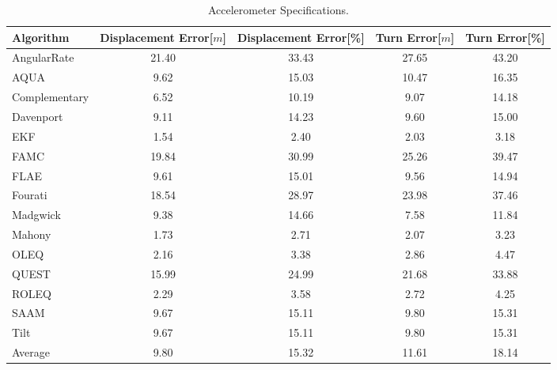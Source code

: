 \begin{table}[H]
    \begin{center}
        \begin{tabular}[t]{lcccc}
            \hline
            Algorithm                   & Displacement Error[$m$] & Displacement Error[\%]      & Turn Error[$m$]  & Turn Error[\%]             \\
            \hline 
            AngularRate            & 21.40  & 33.43 & 27.65 & 43.20              \\            AQUA            & 9.62  & 15.03 & 10.47 & 16.35              \\            Complementary            & 6.52  & 10.19 & 9.07 & 14.18              \\            Davenport            & 9.11  & 14.23 & 9.60 & 15.00              \\            EKF            & 1.54  & 2.40 & 2.03 & 3.18              \\            FAMC            & 19.84  & 30.99 & 25.26 & 39.47              \\            FLAE            & 9.61  & 15.01 & 9.56 & 14.94              \\            Fourati            & 18.54  & 28.97 & 23.98 & 37.46              \\            Madgwick            & 9.38  & 14.66 & 7.58 & 11.84              \\            Mahony            & 1.73  & 2.71 & 2.07 & 3.23              \\            OLEQ            & 2.16  & 3.38 & 2.86 & 4.47              \\            QUEST            & 15.99  & 24.99 & 21.68 & 33.88              \\            ROLEQ            & 2.29  & 3.58 & 2.72 & 4.25              \\            SAAM            & 9.67  & 15.11 & 9.80 & 15.31              \\            Tilt            & 9.67  & 15.11 & 9.80 & 15.31              \\
            \hline
            Average & 9.80 & 15.32 & 11.61 & 18.14
        \end{tabular}
        \caption{Accelerometer Specifications. }
        \label{tab:accelerometer_specification}
    \end{center}
\end{table}